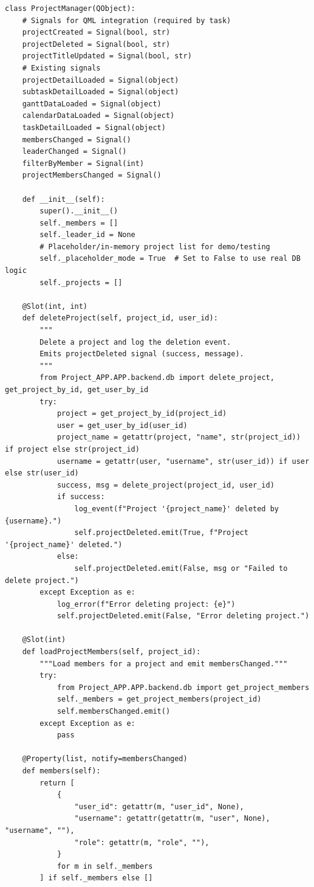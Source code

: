 \documentclass{report}
\begin{document}
\begin{lstlisting}[style=pythonstyle]
class ProjectManager(QObject):
    # Signals for QML integration (required by task)
    projectCreated = Signal(bool, str)
    projectDeleted = Signal(bool, str)
    projectTitleUpdated = Signal(bool, str)
    # Existing signals
    projectDetailLoaded = Signal(object)
    subtaskDetailLoaded = Signal(object)
    ganttDataLoaded = Signal(object)
    calendarDataLoaded = Signal(object)
    taskDetailLoaded = Signal(object)
    membersChanged = Signal()
    leaderChanged = Signal()
    filterByMember = Signal(int)
    projectMembersChanged = Signal()

    def __init__(self):
        super().__init__()
        self._members = []
        self._leader_id = None
        # Placeholder/in-memory project list for demo/testing
        self._placeholder_mode = True  # Set to False to use real DB logic
        self._projects = []

    @Slot(int, int)
    def deleteProject(self, project_id, user_id):
        """
        Delete a project and log the deletion event.
        Emits projectDeleted signal (success, message).
        """
        from Project_APP.APP.backend.db import delete_project, get_project_by_id, get_user_by_id
        try:
            project = get_project_by_id(project_id)
            user = get_user_by_id(user_id)
            project_name = getattr(project, "name", str(project_id)) if project else str(project_id)
            username = getattr(user, "username", str(user_id)) if user else str(user_id)
            success, msg = delete_project(project_id, user_id)
            if success:
                log_event(f"Project '{project_name}' deleted by {username}.")
                self.projectDeleted.emit(True, f"Project '{project_name}' deleted.")
            else:
                self.projectDeleted.emit(False, msg or "Failed to delete project.")
        except Exception as e:
            log_error(f"Error deleting project: {e}")
            self.projectDeleted.emit(False, "Error deleting project.")

    @Slot(int)
    def loadProjectMembers(self, project_id):
        """Load members for a project and emit membersChanged."""
        try:
            from Project_APP.APP.backend.db import get_project_members
            self._members = get_project_members(project_id)
            self.membersChanged.emit()
        except Exception as e:
            pass

    @Property(list, notify=membersChanged)
    def members(self):
        return [
            {
                "user_id": getattr(m, "user_id", None),
                "username": getattr(getattr(m, "user", None), "username", ""),
                "role": getattr(m, "role", ""),
            }
            for m in self._members
        ] if self._members else []


\end{lstlisting}
\end{document}
